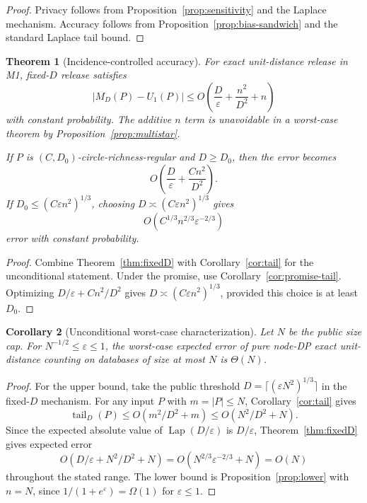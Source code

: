 \documentclass[11pt]{article}
\newtheorem{theorem}{Theorem}[section]
\newtheorem{corollary}[theorem]{Corollary}
\DeclareMathOperator{\Lap}{Lap}
\newcommand{\eps}{\varepsilon}
\newcommand{\tail}{\operatorname{tail}}
\begin{document}
\begin{proof}
Privacy follows from Proposition~\ref{prop:sensitivity} and the Laplace mechanism. Accuracy follows from Proposition~\ref{prop:bias-sandwich} and the standard Laplace tail bound.
\end{proof}

\begin{theorem}[Incidence-controlled accuracy]
\label{thm:incidence-accuracy}
For exact unit-distance release in M1, fixed-\(D\) release satisfies
\[
|M_D(P)-U_1(P)|\le O\!\left(\frac{D}{\eps}+\frac{n^2}{D^2}+n\right)
\]
with constant probability. The additive \(n\) term is unavoidable in a worst-case theorem by Proposition~\ref{prop:multistar}.

If \(P\) is \((C,D_0)\)-circle-richness-regular and \(D\ge D_0\), then the error becomes
\[
O\!\left(\frac{D}{\eps}+\frac{C n^2}{D^2}\right).
\]
If \(D_0\le (C\eps n^2)^{1/3}\), choosing \(D\asymp (C\eps n^2)^{1/3}\) gives
\[
O(C^{1/3}n^{2/3}\eps^{-2/3})
\]
error with constant probability.
\end{theorem}

\begin{proof}
Combine Theorem~\ref{thm:fixedD} with Corollary~\ref{cor:tail} for the unconditional statement. Under the promise, use Corollary~\ref{cor:promise-tail}. Optimizing \(D/\eps+Cn^2/D^2\) gives \(D\asymp(C\eps n^2)^{1/3}\), provided this choice is at least \(D_0\).
\end{proof}

\begin{corollary}[Unconditional worst-case characterization]
\label{cor:uncond-theta}
Let \(N\) be the public size cap. For \(N^{-1/2}\le \eps\le 1\), the worst-case expected error of pure node-DP exact unit-distance counting on databases of size at most \(N\) is \(\Theta(N)\).
\end{corollary}

\begin{proof}
For the upper bound, take the public threshold \(D=\lceil(\eps N^2)^{1/3}\rceil\) in the fixed-\(D\) mechanism. For any input \(P\) with \(m=|P|\le N\), Corollary~\ref{cor:tail} gives
\[
\tail_D(P)\le O(m^2/D^2+m)\le O(N^2/D^2+N).
\]
Since the expected absolute value of \(\Lap(D/\eps)\) is \(D/\eps\), Theorem~\ref{thm:fixedD} gives expected error
\[
O(D/\eps+N^2/D^2+N)=O(N^{2/3}\eps^{-2/3}+N)=O(N)
\]
throughout the stated range. The lower bound is Proposition~\ref{prop:lower} with \(n=N\), since \(1/(1+e^\eps)=\Omega(1)\) for \(\eps\le1\).
\end{proof}
\end{document}
